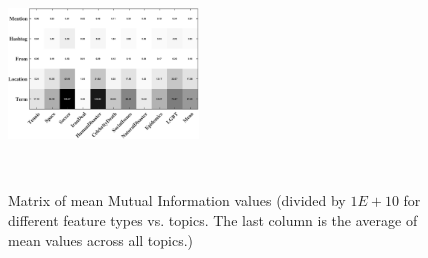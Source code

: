 
\begin{figure}[t!]
\centering
\includegraphics[width=0.45\textwidth, height=60mm]{images/avgMI_gray.pdf}
\caption{Matrix of mean Mutual Information values (divided by $1E+10$ for different feature types vs. topics.  The last column is the average of mean values across all topics.)}
\label{fig:avgMI}
\end{figure}


